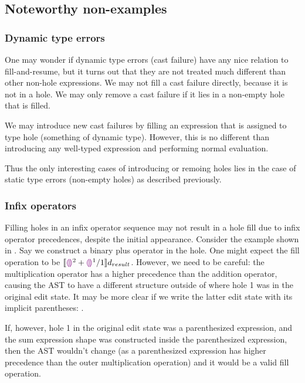 \subsection{Noteworthy non-examples}
\label{sec:far-nonexamples}

\subsubsection{Dynamic type errors}
\label{sec:far-dynamic-type-errors}

One may wonder if dynamic type errors (cast failure) have any nice relation to fill-and-resume, but it turns out that they are not treated much different than other non-hole expressions. We may not fill a cast failure directly, because it is not in a hole. We may only remove a cast failure if it lies in a non-empty hole that is filled.

We may introduce new cast failures by filling an expression that is assigned to type hole (something of dynamic type). However, this is no different than introducing any well-typed expression and performing normal evaluation.

Thus the only interesting cases of introducing or remoing holes lies in the case of static type errors (non-empty holes) as described previously.

\subsubsection{Infix operators}
\label{sec:far-infix-operators}

Filling holes in an infix operator sequence may not result in a hole fill due to infix operator precedences, despite the initial appearance. Consider the example shown in . Say we construct a binary plus operator in the hole. One might expect the fill operation to be $\llbracket{}\textcolor{violet}{\llparenthesis}\textcolor{violet}{\rrparenthesis}^2+\textcolor{violet}{\llparenthesis}\textcolor{violet}{\rrparenthesis}^1/1\rrbracket{}d_{result}$. However, we need to be careful: the multiplication operator has a higher precedence than the addition operator, causing the AST to have a different structure outside of where hole 1 was in the original edit state. It may be more clear if we write the latter edit state with its implicit parentheses: .

If, however, hole 1 in the original edit state was a parenthesized expression, and the sum expression shape was constructed inside the parenthesized expression, then the AST wouldn't change (as a parenthesized expression has higher precedence than the outer multiplication operation) and it would be a valid fill operation.

